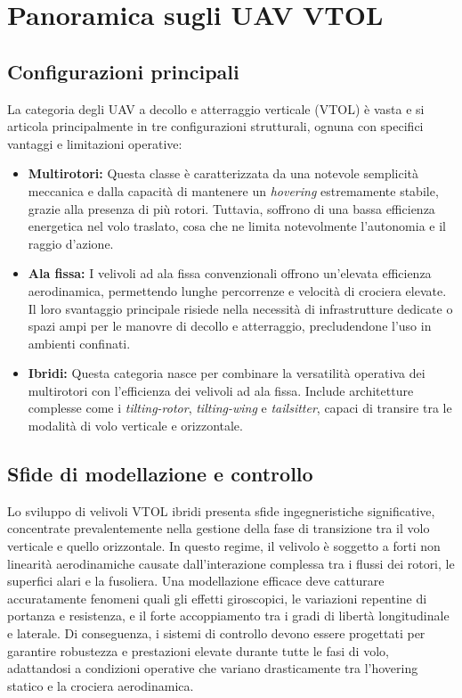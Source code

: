 
\section{Panoramica sugli UAV VTOL}

\subsection{Configurazioni principali}
La categoria degli UAV a decollo e atterraggio verticale (VTOL) è vasta e si articola principalmente in tre configurazioni strutturali, ognuna con specifici vantaggi e limitazioni operative:
\begin{itemize}
    \item \textbf{Multirotori:} Questa classe è caratterizzata da una notevole semplicità meccanica e dalla capacità di mantenere un \textit{hovering} estremamente stabile, grazie alla presenza di più rotori. Tuttavia, soffrono di una bassa efficienza energetica nel volo traslato, cosa che ne limita notevolmente l'autonomia e il raggio d'azione.
    \item \textbf{Ala fissa:} I velivoli ad ala fissa convenzionali offrono un'elevata efficienza aerodinamica, permettendo lunghe percorrenze e velocità di crociera elevate. Il loro svantaggio principale risiede nella necessità di infrastrutture dedicate o spazi ampi per le manovre di decollo e atterraggio, precludendone l'uso in ambienti confinati.
    \item \textbf{Ibridi:} Questa categoria nasce per combinare la versatilità operativa dei multirotori con l'efficienza dei velivoli ad ala fissa. Include architetture complesse come i \textit{tilting-rotor}, \textit{tilting-wing} e \textit{tailsitter}, capaci di transire tra le modalità di volo verticale e orizzontale.
\end{itemize}

\subsection{Sfide di modellazione e controllo}
Lo sviluppo di velivoli VTOL ibridi presenta sfide ingegneristiche significative, concentrate prevalentemente nella gestione della fase di transizione tra il volo verticale e quello orizzontale. In questo regime, il velivolo è soggetto a forti non linearità aerodinamiche causate dall'interazione complessa tra i flussi dei rotori, le superfici alari e la fusoliera.
Una modellazione efficace deve catturare accuratamente fenomeni quali gli effetti giroscopici, le variazioni repentine di portanza e resistenza, e il forte accoppiamento tra i gradi di libertà longitudinale e laterale. 
Di conseguenza, i sistemi di controllo devono essere progettati per garantire robustezza e prestazioni elevate durante tutte le fasi di volo, adattandosi a condizioni operative che variano drasticamente tra l'hovering statico e la crociera aerodinamica.


